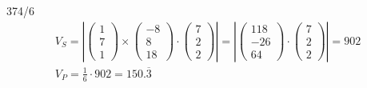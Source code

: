 \begin{exercise}{374/6}
\begin{gather*}
    V_S = \left|\begin{pmatrix}1 \\ 7 \\ 1\end{pmatrix} \times \begin{pmatrix}-8 \\ 8 \\ 18\end{pmatrix} \cdot \begin{pmatrix}7 \\ 2 \\ 2\end{pmatrix}\right| = \left|\begin{pmatrix}118 \\ -26 \\ 64\end{pmatrix} \cdot \begin{pmatrix}7 \\ 2 \\ 2\end{pmatrix}\right| = 902 \\
    V_P = \frac{1}{6} \cdot 902 = 150.\overline{3}
  \end{gather*}
\end{exercise}

